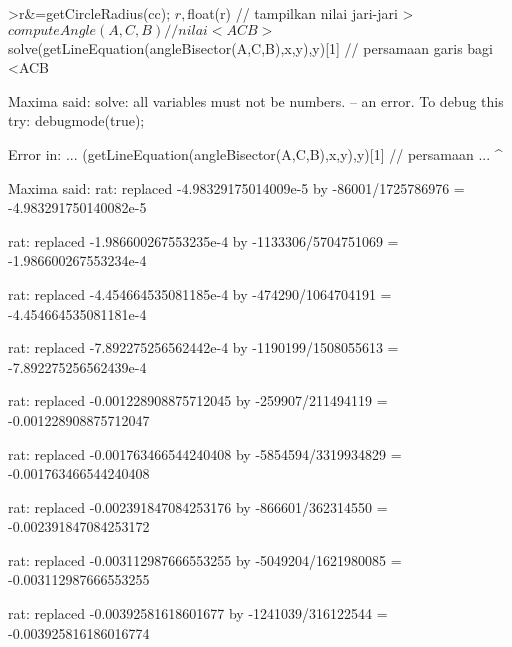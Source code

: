 \documentclass[a4paper,10pt]{article}
\begin{document}
\begin{eulernotebook}
\begin{eulercomment}
\begin{eulercomment}
\begin{eulercomment}
\begin{eulercomment}
\begin{eulercomment}
\begin{eulercomment}
\begin{eulercomment}
\begin{eulercomment}
\begin{eulercomment}
\begin{eulercomment}
\begin{eulercomment}
\begin{eulercomment}
\begin{eulercomment}
\begin{eulercomment}
\begin{eulercomment}
\begin{eulercomment}
\begin{eulerprompt}
>r&=getCircleRadius(cc); $r , $float(r) // tampilkan nilai jari-jari
>$computeAngle(A,C,B) // nilai <ACB
>$solve(getLineEquation(angleBisector(A,C,B),x,y),y)[1] // persamaan garis bagi <ACB
\end{eulerprompt}
\begin{euleroutput}
  Maxima said:
  solve: all variables must not be numbers.
   -- an error. To debug this try: debugmode(true);
  
  Error in:
  ... (getLineEquation(angleBisector(A,C,B),x,y),y)[1] // persamaan  ...
                                                       ^
\end{euleroutput}
\begin{euleroutput}
  Maxima said:
  rat: replaced -4.98329175014009e-5 by -86001/1725786976 = -4.983291750140082e-5
  
  rat: replaced -1.986600267553235e-4 by -1133306/5704751069 = -1.986600267553234e-4
  
  rat: replaced -4.454664535081185e-4 by -474290/1064704191 = -4.454664535081181e-4
  
  rat: replaced -7.892275256562442e-4 by -1190199/1508055613 = -7.892275256562439e-4
  
  rat: replaced -0.001228908875712045 by -259907/211494119 = -0.001228908875712047
  
  rat: replaced -0.001763466544240408 by -5854594/3319934829 = -0.001763466544240408
  
  rat: replaced -0.002391847084253176 by -866601/362314550 = -0.002391847084253172
  
  rat: replaced -0.003112987666553255 by -5049204/1621980085 = -0.003112987666553255
  
  rat: replaced -0.00392581618601677 by -1241039/316122544 = -0.003925816186016774
  

\end{euleroutput}
\end{eulercomment}
\end{eulercomment}
\end{eulercomment}
\end{eulercomment}
\end{eulercomment}
\end{eulercomment}
\end{eulercomment}
\end{eulercomment}
\end{eulercomment}
\end{eulercomment}
\end{eulercomment}
\end{eulercomment}
\end{eulercomment}
\end{eulercomment}
\end{eulercomment}
\end{eulercomment}
\end{eulernotebook}
\end{document}

